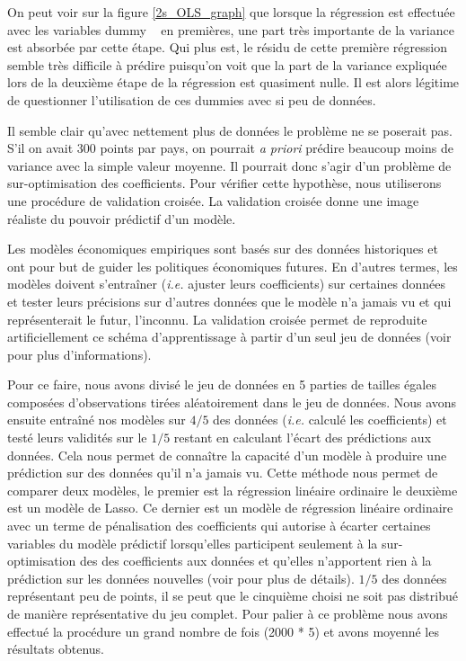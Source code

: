 \documentclass[11pt,a4paper]{article}
\begin{document}
On peut voir sur la figure \ref{2s_OLS_graph} que lorsque la régression est effectuée avec les variables \og dummy \fg~ en premières, une part très importante de la variance est absorbée par cette étape. Qui plus est, le résidu de cette première régression semble très difficile à prédire puisqu'on voit que la part de la variance expliquée lors de la deuxième étape de la régression est quasiment nulle. Il est alors légitime de questionner l'utilisation de ces \og dummies \fg{} avec si peu de données. 

Il semble clair qu'avec nettement plus de données le problème ne se poserait pas. S'il on avait 300 points par pays, on pourrait \textit{a priori} prédire beaucoup moins de variance avec la simple valeur moyenne. Il pourrait donc s'agir d'un problème de sur-optimisation des coefficients. Pour vérifier cette hypothèse, nous utiliserons une procédure de validation croisée. La validation croisée donne une image réaliste du pouvoir prédictif d'un modèle. 

Les modèles économiques empiriques sont basés sur des données historiques et ont pour but de guider les politiques économiques futures. En d'autres termes, les modèles doivent s'entraîner (\textit{i.e.} ajuster leurs coefficients) sur certaines données et tester leurs précisions sur d'autres données que le modèle n'a jamais vu et qui représenterait le futur, l'inconnu. La validation croisée permet de reproduite artificiellement ce schéma d'apprentissage à partir d'un seul jeu de données (voir \cite{hastie} pour plus d'informations). 

Pour ce faire, nous avons divisé le jeu de données en 5 parties de tailles égales composées d'observations tirées aléatoirement dans le jeu de données. Nous avons ensuite entraîné nos modèles sur $4 / 5$ des données (\textit{i.e.} calculé les coefficients) et testé leurs validités sur le $1 / 5$ restant en calculant l'écart des prédictions aux données. Cela nous permet de connaître la capacité d'un modèle à produire une prédiction sur des données qu'il n'a jamais vu. Cette méthode nous permet de comparer deux modèles, le premier est la régression linéaire ordinaire le deuxième est un modèle de Lasso. Ce dernier est un modèle de régression linéaire ordinaire avec un terme de pénalisation des coefficients qui autorise à écarter certaines variables du modèle prédictif lorsqu'elles participent seulement à la sur-optimisation des des coefficients aux données et qu'elles n'apportent rien à la prédiction sur les données nouvelles (voir \cite{hastie_lasso} pour plus de détails). $1 / 5$ des données représentant peu de points, il se peut que le cinquième choisi ne soit pas distribué de manière représentative du jeu complet. Pour palier à ce problème nous avons effectué la procédure un grand nombre de fois (2000 * 5) et avons moyenné les résultats obtenus. 
\end{document}
